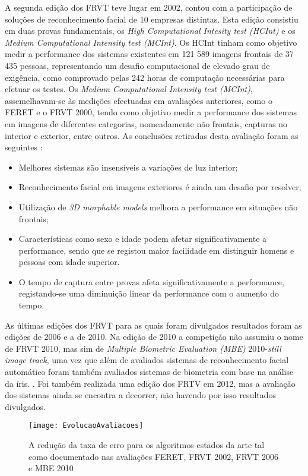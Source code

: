 A segunda edição dos FRVT teve lugar em 2002, contou com a participação de soluções de reconhecimento facial de 10 empresas distintas. Esta edição consistiu em duas provas fundamentais, os \textit{High Computational Intesity test (HCInt)} e os \textit{Medium Computational Intensity test (MCInt)}. Os HCInt tinham como objetivo medir a performance dos sistemas existentes em 121 589 imagens frontais de 37 435 pessoas, representando um desafio computacional de elevado grau de exigência, como comprovado pelas 242 horas de computação necessárias para efetuar os testes. Os \textit{Medium Computational Intensity test (MCInt)}, assemelhavam-se às medições efectuadas em avaliações anteriores, como o FERET e o FRVT 2000, tendo como objetivo medir a performance dos sistemas em imagens de diferentes categorias, nomeadamente não frontais, capturas no interior e exterior, entre outros. As conclusões retiradas desta avaliação foram as seguintes \cite{Chellappa2010, Li2011}:
\begin{itemize}
\item Melhores sistemas são insensíveis a variações de luz interior;
\item Reconhecimento facial em imagens exteriores é ainda um desafio por resolver;
\item Utilização de \textit{3D morphable models} melhora a performance em situações não frontais;
\item Características como sexo e idade podem afetar significativamente a performance, sendo que se registou maior facilidade em distinguir homens e pessoas com idade superior.
\item O tempo de captura entre provas afeta significativamente a performance, registando-se uma diminuição linear da performance com o aumento do tempo.
\end{itemize}

As últimas edições dos FRVT para as quais foram divulgados resultados foram as edições de 2006 \cite{Phillips2007} e a de 2010. Na edição de 2010 a competição não assumiu o nome de FRVT 2010, mas sim de \textit{Multiple Biometric Evaluation (MBE)} 2010-\textit{still image track}, uma vez que além de avaliados sistemas de reconhecimento facial automático foram também avaliados sistemas de biometria com base na análise da íris. \cite{Grother2010}. Foi também realizada uma edição dos FRTV em 2012, mas a avaliação dos sistemas ainda se encontra a decorrer, não havendo por isso resultados divulgados.

\begin{figure}[t]
  \begin{center}
    \leavevmode
    \texttt{[image: EvolucaoAvaliacoes]}
    \caption{A redução da taxa de erro para os algoritmos estados da arte tal como documentado nas avaliações FERET, FRVT 2002, FRVT 2006 e MBE 2010 \cite{Phillips2007, Grother2010}}	
    \label{fig:evolucaoAvaliacoes}
  \end{center}
\end{figure}

